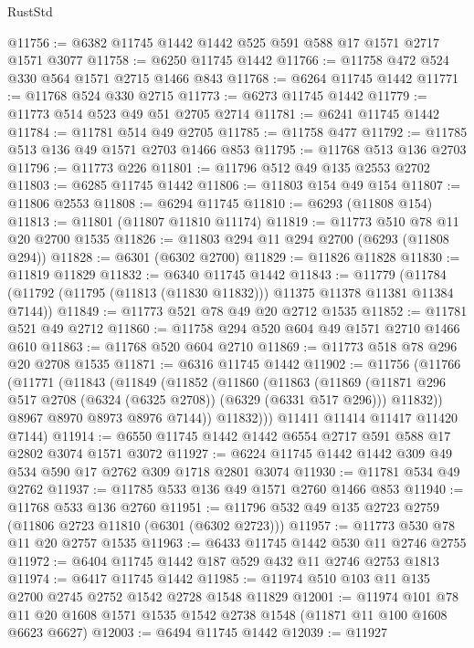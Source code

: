\begin{lexlean}{RustStd}
\begin{coremodule}
{{@11756 := @6382 @11745 @1442 @1442 @525 @591 @588 @17 @1571 @2717 @1571 @3077
@11758 := @6250 @11745 @1442
@11766 := @11758 @472 @524 @330 @564 @1571 @2715 @1466 @843
@11768 := @6264 @11745 @1442
@11771 := @11768 @524 @330 @2715
@11773 := @6273 @11745 @1442
@11779 := @11773 @514 @523 @49 @51 @2705 @2714
@11781 := @6241 @11745 @1442
@11784 := @11781 @514 @49 @2705
@11785 := @11758 @477
@11792 := @11785 @513 @136 @49 @1571 @2703 @1466 @853
@11795 := @11768 @513 @136 @2703
@11796 := @11773 @226
@11801 := @11796 @512 @49 @135 @2553 @2702
@11803 := @6285 @11745 @1442
@11806 := @11803 @154 @49 @154
@11807 := @11806 @2553
@11808 := @6294 @11745
@11810 := @6293 (@11808 @154)
@11813 := @11801 (@11807 @11810 @11174)
@11819 := @11773 @510 @78 @11 @20 @2700 @1535
@11826 := @11803 @294 @11 @294 @2700 (@6293 (@11808 @294))
@11828 := @6301 (@6302 @2700)
@11829 := @11826 @11828
@11830 := @11819 @11829
@11832 := @6340 @11745 @1442
@11843 := @11779
    (@11784 (@11792 (@11795 (@11813 (@11830 @11832))) @11375 @11378 @11381 @11384 @7144))
@11849 := @11773 @521 @78 @49 @20 @2712 @1535
@11852 := @11781 @521 @49 @2712
@11860 := @11758 @294 @520 @604 @49 @1571 @2710 @1466 @610
@11863 := @11768 @520 @604 @2710
@11869 := @11773 @518 @78 @296 @20 @2708 @1535
@11871 := @6316 @11745 @1442
@11902 := @11756
    (@11766
      (@11771
        (@11843
          (@11849
            (@11852
              (@11860
                (@11863
                  (@11869
                    (@11871 @296 @517 @2708 (@6324 (@6325 @2708)) (@6329 (@6331 @517 @296)))
                    @11832))
                @8967
                @8970
                @8973
                @8976
                @7144))
            @11832)))
      @11411
      @11414
      @11417
      @11420
      @7144)
@11914 := @6550 @11745 @1442 @1442 @6554 @2717 @591 @588 @17 @2802 @3074 @1571 @3072
@11927 := @6224 @11745 @1442 @1442 @309 @49 @534 @590 @17 @2762 @309 @1718 @2801 @3074
@11930 := @11781 @534 @49 @2762
@11937 := @11785 @533 @136 @49 @1571 @2760 @1466 @853
@11940 := @11768 @533 @136 @2760
@11951 := @11796 @532 @49 @135 @2723 @2759 (@11806 @2723 @11810 (@6301 (@6302 @2723)))
@11957 := @11773 @530 @78 @11 @20 @2757 @1535
@11963 := @6433 @11745 @1442 @530 @11 @2746 @2755
@11972 := @6404 @11745 @1442 @187 @529 @432 @11 @2746 @2753 @1813
@11974 := @6417 @11745 @1442
@11985 := @11974 @510 @103 @11 @135 @2700 @2745 @2752 @1542 @2728 @1548 @11829
@12001 := @11974
    @101
    @78
    @11
    @20
    @1608
    @1571
    @1535
    @1542
    @2738
    @1548
    (@11871 @11 @100 @1608 @6623 @6627)
@12003 := @6494 @11745 @1442
@12039 := @11927
}}
\end{coremodule}
\end{lexlean}
